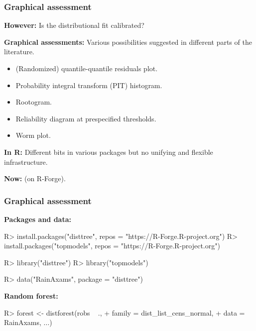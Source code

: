 \documentclass[11pt,t,usepdftitle=false,aspectratio=169]{beamer}
\begin{document}
\begin{frame}[fragile]
\frametitle{Graphical assessment}

\vspace{-0.75em}

\textbf{However:} Is the distributional fit calibrated? 

\bigskip
\pause

\textbf{Graphical assessments:} Various possibilities suggested in different parts of the literature.

\begin{itemize}
  \item (Randomized) quantile-quantile residuals plot.
  \item Probability integral transform (PIT) histogram.
  \item Rootogram.
  \item Reliability diagram at prespecified thresholds.
  \item Worm plot.
\end{itemize}

\bigskip
\pause

\textbf{In R:} Different bits in various packages but no unifying and flexible infrastructure.

\bigskip
\pause

\textbf{Now:}  (on R-Forge). 


\end{frame}


\begin{frame}[fragile]
\frametitle{Graphical assessment}

\vspace{-0.75em}

\textbf{Packages and data:} 

\begin{Schunk}
\begin{Sinput}
R> install.packages("disttree", repos = "https://R-Forge.R-project.org")
R> install.packages("topmodels", repos = "https://R-Forge.R-project.org")
\end{Sinput}
\end{Schunk}
\begin{Schunk}
\begin{Sinput}
R> library("disttree")
R> library("topmodels")
\end{Sinput}
\end{Schunk}
\begin{Schunk}
\begin{Sinput}
R> data("RainAxams", package = "disttree")
\end{Sinput}
\end{Schunk}

\vspace*{1em}

\textbf{Random forest:} 

\begin{Schunk}
\begin{Sinput}
R> forest <- distforest(robs ~ ., 
+                       family = dist_list_cens_normal, 
+                       data = RainAxams, ...)
\end{Sinput}
\end{Schunk}
\end{frame}
\end{document}
